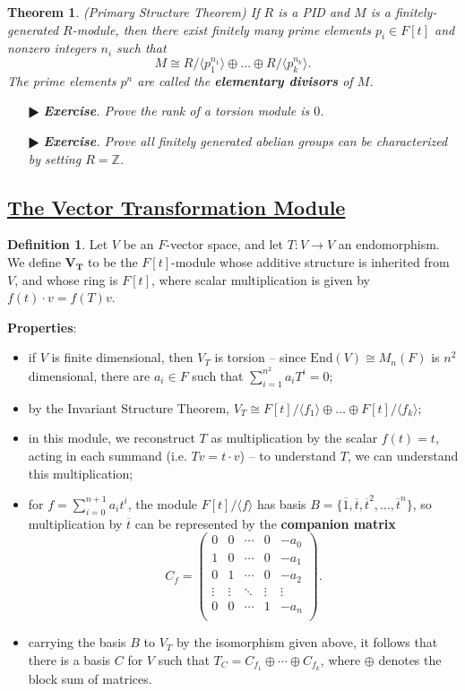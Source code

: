 \documentclass[11pt]{amsart}
\newtheorem*{theorem*}{Theorem}
\theoremstyle{definition}
\newtheorem*{definition*}{Definition}
\renewcommand\:{\colon}
\renewcommand\bar[1]{\overline{#1}}
\newcommand{\Z}{\mathds{Z}}
\newcommand{\1}{\mathds{1}}
\newcommand{\End}{\text{End}}
\newcommand{\exc}[1]{\vspace{-2.5pt}\begin{itemize}[leftmargin=15pt]\item[$\RHD$] \textit{\textbf{Exercise}. #1}\end{itemize}}
\begin{document}
\begin{theorem*}
	\textnormal{(Primary Structure Theorem)} If $R$ is a PID and $M$ is a finitely-generated $R$-module, then there exist finitely many prime elements $p_i \in F[t]$ and nonzero integers $n_i$ such that
		\[ M \cong R/ \langle p_1^{n_1} \rangle \oplus \dots \oplus R/ \langle p_k^{n_k} \rangle. \]
	The prime elements $p^n$ are called the \textbf{elementary divisors} of $M$.
\end{theorem*}

\exc{Prove the rank of a torsion module is $0$.}
\exc{Prove all finitely generated abelian groups can be characterized by setting $R = \Z$.}
\vskip20pt

\subsection*{\underline{The Vector Transformation Module}}
\begin{definition*}
	Let $V$ be an $F$-vector space, and let $T\: V \to V$ an endomorphism. We define $\boldsymbol{V_T}$ to be the $F[t]$-module whose additive structure is inherited from $V$, and whose ring is $F[t]$, where scalar multiplication is given by $f(t) \cdot v = f(T)v$. 
\end{definition*}

\noindent \textbf{Properties}:
\begin{itemize}[leftmargin=*]\setlength\itemsep{0em}
	\item if $V$ is finite dimensional, then $V_T$ is torsion -- since $\End(V) \cong M_n(F)$ is $n^2$ dimensional, there are $a_i \in F$ such that $\sum_{i=1}^{n^2} a_iT^i = 0$;
	\item by the Invariant Structure Theorem, $V_T \cong F[t]/ \langle f_1 \rangle \oplus \dots \oplus F[t]/ \langle f_k \rangle$;
	\item in this module, we reconstruct $T$ as multiplication by the scalar $f(t) = t$, acting in each summand (i.e. $Tv = t \cdot v$) -- to understand $T$, we can understand this multiplication;
	\item for $f = \sum_{i=0}^{n+1} a_it^i$, the module $F[t]/ \langle f \rangle$ has basis $B = \{ \bar 1, \bar t, \bar t^2, \dots, \bar t^n\}$, so multiplication by $\bar t$ can be represented by the \textbf{companion matrix}
		\[ C_f = \begin{pmatrix} 
			0 & 0 & \cdots & 0 & -a_0 \\
			1 & 0 &\cdots & 0 & -a_1 \\
			0 & 1 & \cdots & 0 & -a_2 \\
			\vdots & \vdots & \ddots & \vdots & \vdots  \\
			0 & 0 & \cdots & 1 & -a_n \\
		\end{pmatrix}. \]
	\item carrying the basis $B$ to $V_T$ by the isomorphism given above, it follows that there is a basis $C$ for $V$ such that $T_C = C_{f_1} \oplus \cdots \oplus C_{f_k}$, where $\oplus$ denotes the block sum of matrices.
\end{itemize}
\end{document}
